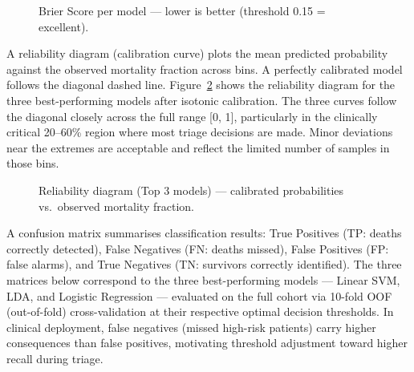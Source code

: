 \documentclass[12pt,a4paper,twoside]{report}
\begin{document}
\begin{figure}[htbp]
\centering
{}
\caption{Brier Score per model --- lower is better (threshold 0.15 = excellent).}
\label{fig:brier_score}
\end{figure}

\FloatBarrier
A reliability diagram (calibration curve) plots the mean predicted probability against the observed mortality fraction across bins. A perfectly calibrated model follows the diagonal dashed line. Figure~\ref{fig:calibration} shows the reliability diagram for the three best-performing models after isotonic calibration. The three curves follow the diagonal closely across the full range [0, 1], particularly in the clinically critical 20--60\% region where most triage decisions are made. Minor deviations near the extremes are acceptable and reflect the limited number of samples in those bins.

\begin{figure}[htbp]
\centering
{}
\caption{Reliability diagram (Top 3 models) --- calibrated probabilities vs.\ observed mortality fraction.}
\label{fig:calibration}
\end{figure}

\FloatBarrier
A confusion matrix summarises classification results: True Positives (TP: deaths correctly detected), False Negatives (FN: deaths missed), False Positives (FP: false alarms), and True Negatives (TN: survivors correctly identified). The three matrices below correspond to the three best-performing models — Linear SVM, LDA, and Logistic Regression — evaluated on the full cohort via 10-fold OOF (out-of-fold) cross-validation at their respective optimal decision thresholds. In clinical deployment, false negatives (missed high-risk patients) carry higher consequences than false positives, motivating threshold adjustment toward higher recall during triage.
\end{document}
